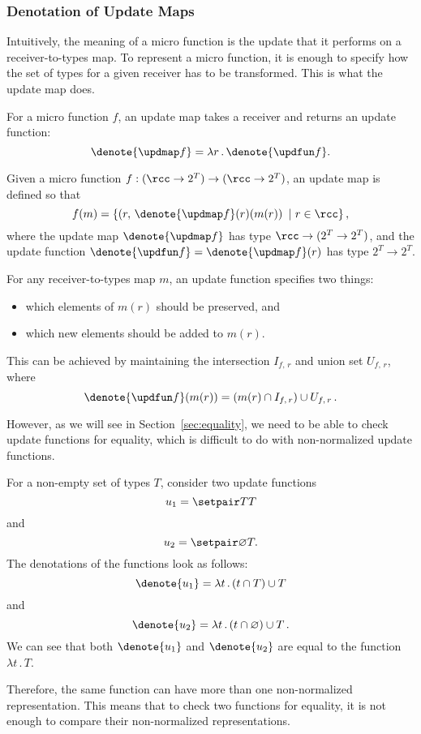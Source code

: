 \subsubsection{Denotation of Update Maps}
Intuitively, the meaning of a micro function is the update that it performs on a receiver-to-types map. To represent a micro function, it is enough to specify how the set of types for a given receiver has to be transformed. This is what the update map does.

For a micro function $f$, an update map takes a receiver and returns an update function:
\begin{equation}
  \denote{\updmap f}=\lambda r\,.\,\denote{\updfun f}.
\end{equation}

Given a micro function $f:(\rcc\to 2^T)\to(\rcc\to2^T)$, an update map is defined so that
\begin{equation}
    f(m)=\left\{\left(r,\,\denote{\updmap f}(r)(m(r)\right)\ |\ r\in\rcc\right\},
\end{equation}
where the update map $\denote{\updmap f}$ has type $\rcc\to(2^T\to2^T)$, and the update function  $\denote{\updfun f}=\denote{\updmap f}(r)$ has type $2^T\to2^T$.

For any receiver-to-types map $m$, an update function specifies two things:
\begin{itemize}
    \item which elements of $m(r)$ should be preserved, and 
    \item which new elements should be added to $m(r)$.
\end{itemize}
This can be achieved by maintaining  the intersection $I_{f,\,r}$ and union set $U_{f,\,r}$, where
\begin{equation}
    \denote{\updfun f}(m(r))=(m(r)\cap I_{f,\,r})\cup U_{f,\,r}\,.
\end{equation}

However, as we will see in Section~\ref{sec:equality}, we need to be able to check update functions for equality, which is difficult to do with non-normalized update functions.

\begin{example}
 For a non-empty set of types $T$, consider two update functions
 $$u_1=\setpair T T$$ 
and 
$$u_2=\setpair\varnothing T.$$
The denotations of the functions look as follows:
$$\denote{u_1}=\lambda t\,.\,(t\cap T)\cup T$$ and $$\denote{u_2}=\lambda t\,.\,(t\cap\varnothing)\cup T\,.$$
We can see that both $\denote{u_1}$ and $\denote{u_2}$ are equal to the function $\lambda t\,.\,T$.

Therefore, the same function can have more than one non-normalized representation. This means that to check two functions for equality, it is not enough to compare their non-normalized representations.
\end{example}

